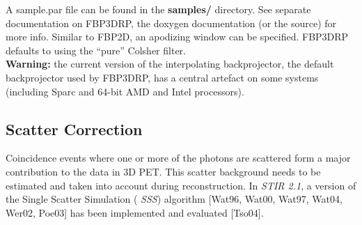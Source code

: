 \documentclass{article}
\begin{document}
A sample.par file can be found in the \textbf{samples/} 
directory. See separate documentation on FBP3DRP, the doxygen documentation 
(or the source) for more info. Similar to FBP2D, an apodizing window can be specified.
FBP3DRP defaults to using the ``pure'' Colsher filter. \\
\textbf{Warning:} the current version of the interpolating backprojector, 
the default backprojector used by FBP3DRP, has a central artefact 
on some systems (including Sparc and 64-bit AMD and Intel processors).

\subsection{
Scatter Correction}
Coincidence events where one or more of the photons are scattered form a major contribution to the data
in 3D PET. This scatter background needs to be estimated and taken into account during reconstruction. In
\textit{STIR 2.1}, a version of the Single Scatter Simulation ( \textit{SSS}) algorithm [Wat96, Wat00,
Wat97, Wat04, Wer02, Poe03] has been implemented and evaluated [Tso04].
\end{document}

